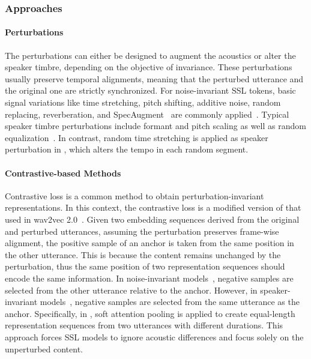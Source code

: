 \subsubsection{Approaches}


\paragraph{Perturbations}
The perturbations can either be designed to augment the acoustics or alter the speaker timbre, depending on the objective of invariance.
These perturbations usually preserve temporal alignments, meaning that the perturbed utterance and the original one are strictly synchronized.
For noise-invariant SSL tokens, basic signal variations like time stretching, pitch shifting, additive noise, random replacing, reverberation, and SpecAugment~\cite{park2020specaugment} are commonly applied~\cite{gat2023augmentation,ccc-wav2vec2.0,messica2024nast,huang2022spiral}.
Typical speaker timbre perturbations include formant and pitch scaling as well as random equalization~\cite{qian2022contentvec,chang23_interspeech,chang2024dc}.
In contrast, random time stretching is applied as speaker perturbation in \cite{hwang2024removing}, which alters the tempo in each random segment.

\paragraph{Contrastive-based Methods}
Contrastive loss is a common method to obtain perturbation-invariant representations.
In this context, the contrastive loss is a modified version of that used in wav2vec 2.0~\cite{baevski2020wav2vec}.
Given two embedding sequences derived from the original and perturbed utterances, assuming the perturbation preserves frame-wise alignment, the positive sample of an anchor is taken from the same position in the other utterance.
This is because the content remains unchanged by the perturbation, thus the same position of two representation sequences should encode the same information.
In noise-invariant models~\cite{huang2022spiral,ccc-wav2vec2.0}, negative samples are selected from the other utterance relative to the anchor.
However, in speaker-invariant models~\cite{qian2022contentvec,hwang2024removing}, negative samples are selected from the same utterance as the anchor.
Specifically, in \cite{hwang2024removing}, soft attention pooling is applied to create equal-length representation sequences from two utterances with different durations.
This approach forces SSL models to ignore acoustic differences and focus solely on the unperturbed content.

